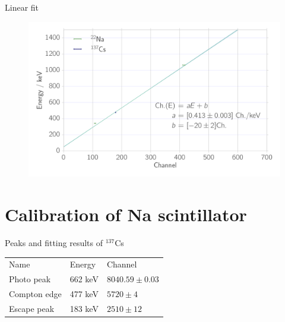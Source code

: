 \documentclass[xcolor=x11names,compress]{beamer}
\renewcommand{\(}{\begin{columns}}
\renewcommand{\)}{\end{columns}}
\newcommand{\<}[1]{\begin{column}{#1}}
\renewcommand{\>}{\end{column}}
\begin{document}
\begin{frame}[t]{Linear fit}
\begin{figure}[htpb]
    \centering
    \includegraphics[width=1.0\linewidth]{../analysis/figures/calibration_ps_linear_fit}
\label{fig:calibration_ps_linear_fit}
\end{figure}
\end{frame}

\section{Calibration of Na scintillator}

\begin{frame}[t]{Peaks and fitting results of $^{137}$Cs}
    \begin{table}[htpb]
    \centering
\label{tab:peaks_cs_ps}
    \begin{tabular}{lll}
        \rowcolor{LightCyan} Name &Energy & Channel \\ 
        Photo peak & 662 keV & $8040.59 \pm 0.03$\\ 
        Compton edge & 477 keV & $5720 \pm 4$\\  
        Escape peak & 183 keV & $2510 \pm 12$
    \end{tabular}
\end{table}
\end{frame}
\end{document}

